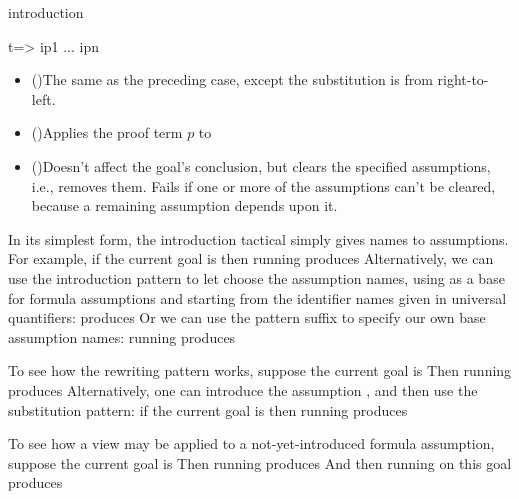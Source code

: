 \begin{tactic}[$t$ =>$\;\iota_1 \cdots \iota_n$]{introduction}
\begin{tsyntax}[empty]{t=> ip1 ... ipn}
\begin{itemize}
    \item (\ec{<$$<-})\quad The same as the preceding case, except
      the substitution is from right-to-left.

    \item ()\quad Applies the proof term $p$ to

    \item ()\quad Doesn't affect the goal's
      conclusion, but clears the specified assumptions, i.e., removes
      them. Fails if one or more of the assumptions can't be cleared,
      because a remaining assumption depends upon it.

    \end{itemize}

    In its simplest form, the introduction tactical simply gives names
    to assumptions.  For example, if the current goal is
    then running
    produces
    Alternatively, we can use the introduction pattern 
    to let \EasyCrypt choose the assumption names, using
     as a base for formula assumptions and starting
    from the identifier names given in universal quantifiers:
    produces
    Or we can use the \ec{!} pattern suffix to specify our
    own base assumption names: running
    produces

    To see how the \ec{->} rewriting pattern works, suppose
    the current goal is
    Then running
    produces
    Alternatively, one can introduce the assumption ,
    and then use the \ec{->>} substitution pattern:
    if the current goal is
    then running
    produces

    To see how a view may be applied to a not-yet-introduced formula
    assumption, suppose the current goal is
    Then running
    produces
    And then running
    on this goal produces


\end{tsyntax}
\end{tactic}
